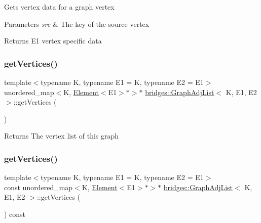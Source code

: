 Gets vertex data for a graph vertex


\begin{DoxyParams}{Parameters}
{\em src} & The key of the source vertex\\
\hline
\end{DoxyParams}
\begin{DoxyReturn}{Returns}
E1 vertex specific data 
\end{DoxyReturn}
\mbox{\label{classbridges_1_1_graph_adj_list_a157c80e2bd439572f4f80e8850700297}} 
\subsubsection{\texorpdfstring{get\+Vertices()}{getVertices()}\hspace{0.1cm}{\footnotesize\ttfamily [1/2]}}
{\footnotesize\ttfamily template$<$typename K, typename E1 = K, typename E2 = E1$>$ \\
unordered\+\_\+map$<$K, \mbox{\hyperlink{classbridges_1_1_element}{Element}}$<$E1$>$$\ast$$>$$\ast$ \mbox{\hyperlink{classbridges_1_1_graph_adj_list}{bridges\+::\+Graph\+Adj\+List}}$<$ K, E1, E2 $>$\+::get\+Vertices (\begin{DoxyParamCaption}{ }\end{DoxyParamCaption})\hspace{0.3cm}{\ttfamily [inline]}}

\begin{DoxyReturn}{Returns}
The vertex list of this graph 
\end{DoxyReturn}
\mbox{\label{classbridges_1_1_graph_adj_list_ac33be2c332e16c0060969808eda1609b}} 
\subsubsection{\texorpdfstring{get\+Vertices()}{getVertices()}\hspace{0.1cm}{\footnotesize\ttfamily [2/2]}}
{\footnotesize\ttfamily template$<$typename K, typename E1 = K, typename E2 = E1$>$ \\
const unordered\+\_\+map$<$K, \mbox{\hyperlink{classbridges_1_1_element}{Element}}$<$E1$>$$\ast$$>$$\ast$ \mbox{\hyperlink{classbridges_1_1_graph_adj_list}{bridges\+::\+Graph\+Adj\+List}}$<$ K, E1, E2 $>$\+::get\+Vertices (\begin{DoxyParamCaption}{ }\end{DoxyParamCaption}) const\hspace{0.3cm}{\ttfamily [inline]}}

